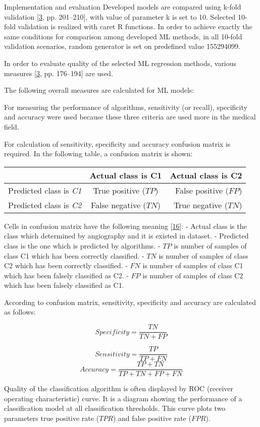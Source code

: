\documentclass[
  ignorenonframetext,
]{beamer}
\begin{document}
\begin{frame}[fragile]{Implementation and evaluation}
Developed models are compared using k-fold validation
{[}\protect\hyperlink{ref-murphy}{3}, pp. 201--210{]}, with value of
parameter k is set to 10. Selected 10-fold validation is realized with
caret R functions. In order to achieve exactly the same conditions for
comparison among developed ML methods, in all 10-fold validation
scenarios, random generator is set on predefined value 155294099.

In order to evaluate quality of the selected ML regression methods,
various measures {[}\protect\hyperlink{ref-murphy}{3}, pp. 176--194{]}
are used.

The following overall measures are calculated for ML models:

For measuring the performance of algorithms, sensitivity (or recall),
specificity and accuracy were used because these three criteria are used
more in the medical field.

For calculation of sensitivity, specificity and accuracy confusion
matrix is required. In the following table, a confusion matrix is shown:

\begin{longtable}[]{@{}lcr@{}}
\toprule
& Actual class is C1 & Actual class is C2\tabularnewline
\midrule
\endhead
Predicted class is \emph{C1} & True positive (\(TP\)) & False positive
(\(FP\))\tabularnewline
Predicted class is \emph{C2} & False negative (\(TN\)) & True negative
(\(TN\))\tabularnewline
\bottomrule
\end{longtable}

Cells in confusion matrix have the following meaning
{[}\protect\hyperlink{ref-alizedah2019}{16}{]}: - Actual class is the
class which determined by angiography and it is existed in dataset. -
Predicted class is the one which is predicted by algorithms. - \(TP\) is
number of samples of class C1 which has been correctly classified. -
\(TN\) is number of samples of class C2 which has been correctly
classified. - \(FN\) is number of samples of class C1 which has been
falsely classified as C2. - \(FP\) is number of samples of class C2
which has been falsely classified as C1.

According to confusion matrix, sensitivity, specificity and accuracy are
calculated as follows:

\[ Specificity = \frac{TN}{TN+FP} \]

\[ Sensitivity = \frac{TP}{TP+FN}  \]
\[ Accuracy = \frac{TP+TN}{TP+TN+FP+FN}  \]

Quality of the classification algorithm is often displayed by ROC
(receiver operating characteristic) curve. It is a diagram showing the
performance of a classification model at all classification thresholds.
This curve plots two parameters true positive rate (\(TPR\)) and false
positive rate (\(FPR\)).


\end{frame}
\end{document}
